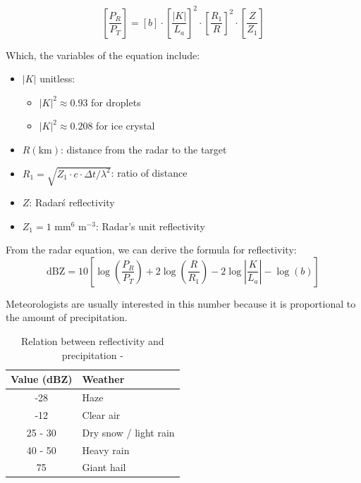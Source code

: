 \[
    \left[ \frac{P_R}{P_T} \right]=\left[ b \right]\cdot\left[ \frac{|K|}{L_a} \right]^2\cdot\left[ \frac{R_1}{R} \right]^2\cdot\left[ \frac{Z}{Z_1} \right]
\]
\vspace{0.5cm}

Which, the variables of the equation include:
\begin{itemize}
    \item $|K|$ unitless:
          \begin{itemize}
              \item $|K|^2 \approx 0.93$ for droplets
              \item $|K|^2 \approx 0.208$ for ice crystal
          \end{itemize}
    \item $R (\text{km})$: distance from the radar to the target
    \item $R_1 = \sqrt{Z_1 \cdot c \cdot \Delta t / \lambda^2}$: ratio of
          distance
    \item $Z$: Radar\'s reflectivity
    \item $Z_1 = 1 \text{ mm}^6 \text{ m}^{-3}$: Radar's unit reflectivity
\end{itemize}

From the radar equation, we can derive the formula for reflectivity:
\vspace{0.5cm}
\[
    \text{dBZ} = 10\left[ \log\left( \frac{P_R}{P_T} \right) + 2 \log\left( \frac{R}{R_1} \right) - 2\log\left| \frac{K}{L_a} \right| - \log\left( b \right) \right]
\]

Meteorologists are usually interested in this number because it is proportional
to the amount of precipitation.

\begin{table}[H]
    \centering
    \begin{tabular}{|c|l|}
        \hline
        Value (dBZ) & Weather               \\
        \hline
        -28         & Haze                  \\
        -12         & Clear air             \\
        25 - 30     & Dry snow / light rain \\
        40 - 50     & Heavy rain            \\
        75          & Giant hail            \\
        \hline
    \end{tabular}
    \vspace{1em}
    \caption{ Relation between reflectivity and precipitation -
        \citet{2022Weather}}
\end{table}

